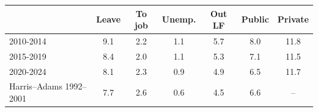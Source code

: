 \begin{tabular}{lcccccc}
\toprule
 & Leave & To job & Unemp. & Out LF & Public & Private \\
\midrule
2010-2014 & 9.1 & 2.2 & 1.1 & 5.7 & 8.0 & 11.8 \\
2015-2019 & 8.4 & 2.0 & 1.1 & 5.3 & 7.1 & 11.5 \\
2020-2024 & 8.1 & 2.3 & 0.9 & 4.9 & 6.5 & 11.7 \\
\midrule
Harris--Adams 1992--2001 & 7.7 & 2.6 & 0.6 & 4.5 & 6.6 & -- \\
\bottomrule
\end{tabular}
